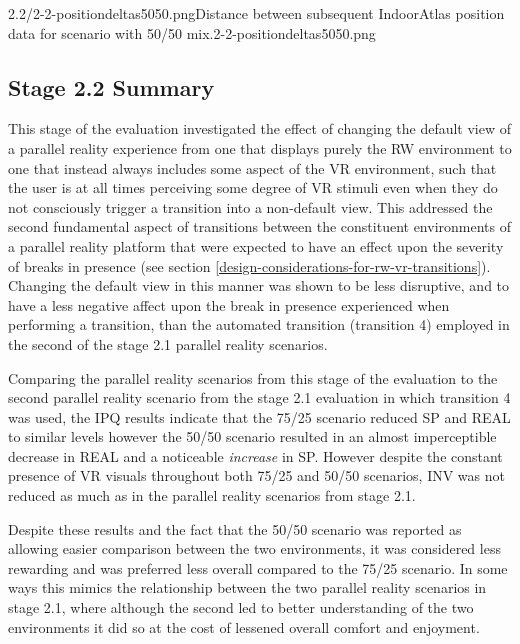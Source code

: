        {2.2/2-2-positiondeltas5050.png}{Distance between subsequent IndoorAtlas position data for scenario with 50/50 mix.}{2-2-positiondeltas5050.png}


\subsection{Stage 2.2 Summary}
\label{stage-2-2-summary}
This stage of the evaluation investigated the effect of changing the default view of a parallel reality experience from one that displays purely the RW environment to one that instead always includes some aspect of the VR environment, such that the user is at all times perceiving some degree of VR stimuli even when they do not consciously trigger a transition into a non-default view. This addressed the second fundamental aspect of transitions between the constituent environments of a parallel reality platform that were expected to have an effect upon the severity of breaks in presence (see section \ref{design-considerations-for-rw-vr-transitions}). Changing the default view in this manner was shown to be less disruptive, and to have a less negative affect upon the break in presence experienced when performing a transition, than the automated transition (transition 4) employed in the second of the stage 2.1 parallel reality scenarios.

Comparing the parallel reality scenarios from this stage of the evaluation to the second parallel reality scenario from the stage 2.1 evaluation in which transition 4 was used, the IPQ results indicate that the 75/25 scenario reduced SP and REAL to similar levels however the 50/50 scenario resulted in an almost imperceptible decrease in REAL and a noticeable \textit{increase} in SP. However despite the constant presence of VR visuals throughout both 75/25 and 50/50 scenarios, INV was not reduced as much as in the parallel reality scenarios from stage 2.1.

Despite these results and the fact that the 50/50 scenario was reported as allowing easier comparison between the two environments, it was considered less rewarding and was preferred less overall compared to the 75/25 scenario. In some ways this mimics the relationship between the two parallel reality scenarios in stage 2.1, where although the second led to better understanding of the two environments it did so at the cost of lessened overall comfort and enjoyment.

